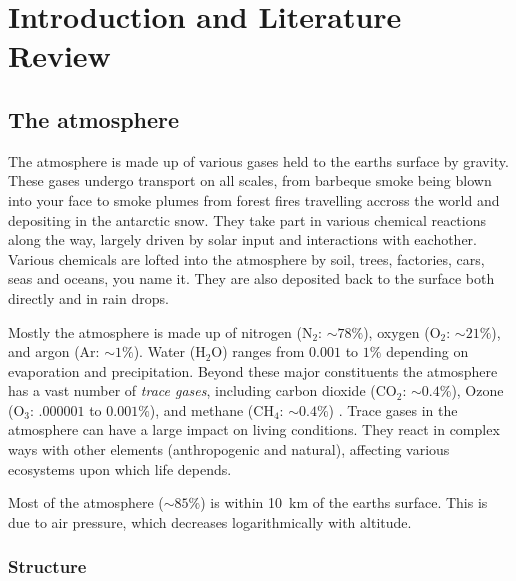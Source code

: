 \chapter{Introduction and Literature Review} %
\label{LR}

\section{The atmosphere}
\label{LR:Atmos}
  The atmosphere is made up of various gases held to the earths surface by gravity. 
  These gases undergo transport on all scales, from barbeque smoke being blown into your face to smoke plumes from forest fires travelling accross the world and depositing in the antarctic snow.
  They take part in various chemical reactions along the way, largely driven by solar input and interactions with eachother.
  Various chemicals are lofted into the atmosphere by soil, trees, factories, cars, seas and oceans, you name it.
  They are also deposited back to the surface both directly and in rain drops.
  
  Mostly the atmosphere is made up of nitrogen (N$_2$: $\sim 78\%$), oxygen (O$_2$: $\sim 21\%$), and argon (Ar: $\sim 1\%$).
  Water (H$_2$O) ranges from $0.001$ to $1\%$ depending on evaporation and precipitation.
  Beyond these major constituents the atmosphere has a vast number of \textit{trace gases}, including carbon dioxide (CO$_2$: $\sim 0.4\%$), Ozone (O$_3$: $.000001$ to $0.001\%$), and methane (CH$_4$: $\sim 0.4\%$) \cite[][Ch. 2]{BrasseurJacob2017}.
  Trace gases in the atmosphere can have a large impact on living conditions.
  They react in complex ways with other elements (anthropogenic and natural), affecting various ecosystems upon which life depends.
  
  Most of the atmosphere ($\sim 85\%$) is within 10~km of the earths surface.
  This is due to air pressure, which decreases logarithmically with altitude.
  

  
  \subsection{Structure}
  \label{LR:Atmos:Struct}
    
    
    
    
